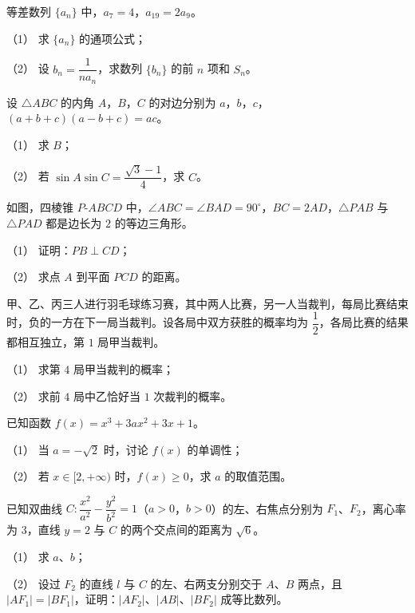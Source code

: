 \begin{question}
等差数列 $\{a_n\}$ 中，$a_7=4$，$a_{19}=2a_9$。

（1） 求 $\{a_n\}$ 的通项公式；

（2） 设 $b_n=\dfrac1{na_n}$，求数列 $\{b_n\}$ 的前 $n$ 项和 $S_n$。

\end{question}
\begin{question}
设 $\triangle ABC$ 的内角 $A$，$B$，$C$ 的对边分别为 $a$，$b$，$c$，$(a+b+c)(a-b+c)=ac$。

（1） 求 $B$；

（2） 若 $\sin A\sin C=\dfrac{\sqrt3-1}4$，求 $C$。

\Needspace{0.4\textheight}
\end{question}
\begin{question}
如图，四棱锥 $P\text{-}ABCD$ 中，$\angle ABC=\angle BAD=90^\circ$，$BC=2AD$，$\triangle PAB$ 与 $\triangle PAD$ 都是边长为 $2$ 的等边三角形。

（1） 证明：$PB\perp CD$；

（2） 求点 $A$ 到平面 $PCD$ 的距离。
\nopagebreak[4]
\begin{center}\end{center}
\nopagebreak[4]
\end{question}
\begin{question}
甲、乙、丙三人进行羽毛球练习赛，其中两人比赛，另一人当裁判，每局比赛结束时，负的一方在下一局当裁判。设各局中双方获胜的概率均为 $\dfrac12$，各局比赛的结果都相互独立，第 $1$ 局甲当裁判。

（1） 求第 $4$ 局甲当裁判的概率；

（2） 求前 $4$ 局中乙恰好当 $1$ 次裁判的概率。

\end{question}
\begin{question}
已知函数 $f(x)=x^3+3ax^2+3x+1$。

（1） 当 $a=-\sqrt2$ 时，讨论 $f(x)$ 的单调性；

（2） 若 $x\in[2,+\infty)$ 时，$f(x)\geqslant0$，求 $a$ 的取值范围。

\end{question}
\begin{question}
已知双曲线 $C:\dfrac{x^2}{a^2}-\dfrac{y^2}{b^2}=1$（$a>0$，$b>0$）的左、右焦点分别为 $F_1$、$F_2$，离心率为 $3$，直线 $y=2$ 与 $C$ 的两个交点间的距离为 $\sqrt6$。

（1） 求 $a$、$b$；

（2） 设过 $F_2$ 的直线 $l$ 与 $C$ 的左、右两支分别交于 $A$、$B$ 两点，且 $|AF_1|=|BF_1|$，证明：$|AF_2|$、$|AB|$、$|BF_2|$ 成等比数列。

\end{question}